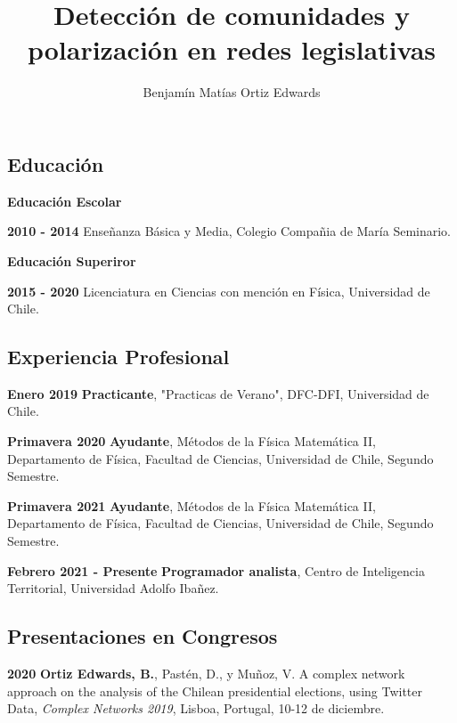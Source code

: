 \documentclass[hyperref]{proyectotesis}
\title{Detección de comunidades y polarización en redes legislativas}
\author{Benjamín Matías Ortiz Edwards}
\begin{document}
\setlength{\cvlabelwidth}{45mm}             %

\maketitlepage
\makepersonalinfo

\subsection{Educación}
\begin{cvlist}{}
\item[\bf Educación Escolar]
\item[\textbf{2010 - 2014}]  Enseñanza Básica y Media, Colegio Compañia de María Seminario.
\item[\textbf{Educación Superiror}] 
\item[\textbf{2015 - 2020}] Licenciatura en Ciencias con mención en Física, Universidad de Chile.
\end{cvlist}

\subsection{Experiencia Profesional}
\begin{cvlist}{}
\item[\textbf{Enero 2019}]  \textbf{Practicante}, "Practicas de Verano", DFC-DFI, Universidad de Chile.   
\item[\textbf{Primavera 2020}]   \textbf{Ayudante},  Métodos de la Física Matemática II, Departamento de Física, Facultad de Ciencias, Universidad de Chile, Segundo Semestre.
\item[\textbf{Primavera 2021}]   \textbf{Ayudante},  Métodos de la Física Matemática II, Departamento de Física, Facultad de Ciencias, Universidad de Chile, Segundo Semestre.
\item[\textbf{Febrero 2021 - Presente}] \textbf{Programador analista}, Centro de Inteligencia Territorial, Universidad Adolfo Ibañez. 

\end{cvlist}

\subsection{Presentaciones en Congresos}

\begin{cvlist}{}
\item[\textbf{2020}] \textbf{Ortiz Edwards, B.}, Pastén, D., y Muñoz, V. A complex network approach on the analysis of the Chilean presidential elections, using Twitter Data, {\it Complex Networks 2019}, Lisboa, Portugal, 10-12 de diciembre.

\end{cvlist}
\end{document}

